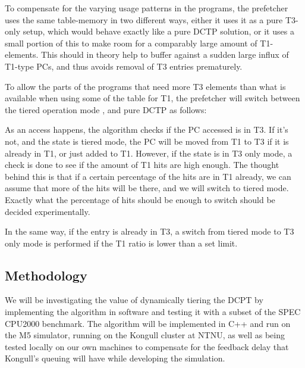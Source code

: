 To compensate for the varying usage patterns in the programs, the prefetcher
uses the same table-memory in two different ways, either it uses it as a pure
T3-only setup, which would behave exactly like a pure DCTP solution, or it
uses a small portion of this to make room for a comparably large amount of
T1-elements. This should in theory help to buffer against a sudden large
influx of T1-type PCs, and thus avoids removal of T3 entries
prematurely.

To allow the parts of the programs that need more T3 elements than what is
available when using some of the table for T1, the prefetcher will switch
between the tiered operation mode , and pure DCTP as follows:

As an access happens, the algorithm checks if the PC accessed is in T3. If it's
not, and the state is tiered mode, the PC will be moved from T1 to T3 if it is
already in T1, or just added to T1. However, if the state is in T3 only
mode, a check is done to see if the amount of T1 hits are high enough. The
thought behind this is that if a certain percentage of the hits are in T1
already, we can assume that more of the hits will be there, and we will switch
to tiered mode. Exactly what the percentage of hits should be enough to
switch should be decided experimentally.

In the same way, if the entry is already in T3, a switch from tiered mode to
T3 only mode is performed if the T1 ratio is lower than a set limit.


\subsection{Methodology}

We will be investigating the value of dynamically tiering the DCPT by
implementing the algorithm in software and testing it with a subset of the SPEC
CPU2000 benchmark.  The algorithm will be implemented in C++ and run on the M5
simulator, running on the Kongull cluster at NTNU, as well as being tested locally
on our own machines to compensate for the feedback delay that Kongull's queuing will
have while developing the simulation.
